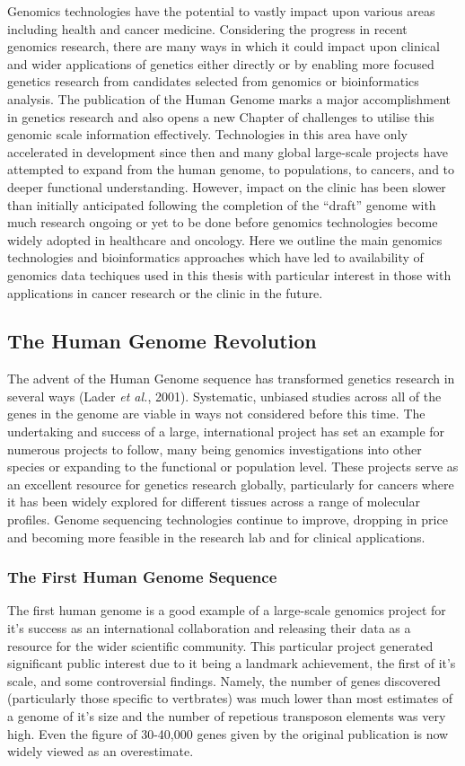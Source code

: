 Genomics technologies have the potential to vastly impact upon various areas including health and cancer medicine. Considering the progress in recent genomics research, there are many ways in which it could impact upon clinical and wider applications of genetics either directly or by enabling more focused genetics research from candidates selected from genomics or bioinformatics analysis. The publication of the Human Genome marks a major accomplishment in genetics research and also opens a new Chapter of challenges to utilise this genomic scale information effectively. Technologies in this area have only accelerated in development since then and many global large-scale projects have attempted to expand from the human genome, to populations, to cancers, and to deeper functional understanding. However, impact on the clinic has been slower than initially anticipated following the completion of the ``draft'' genome with much research ongoing or yet to be done before genomics technologies become widely adopted in healthcare and oncology. Here we outline the main genomics technologies and bioinformatics approaches which have led to availability of genomics data techiques used in this thesis with particular interest in those with applications in cancer research or the clinic in the future. 

\subsection{The Human Genome Revolution}
The advent of the Human Genome sequence has transformed genetics research in several ways (Lader \textit{et al.}, 2001). Systematic, unbiased studies across all of the genes in the genome are viable in ways not considered before this time. The undertaking and success of a large, international project has set an example for numerous projects to follow, many being genomics investigations into other species or expanding to the functional or population level. These projects serve as an excellent resource for genetics research globally, particularly for cancers where it has been widely explored for different tissues across a range of molecular profiles. Genome sequencing technologies continue to improve, dropping in price and becoming more feasible in the research lab and for clinical applications.

\subsubsection{The First Human Genome Sequence}
The first human genome is a good example of a large-scale genomics project for it's success as an international collaboration and releasing their data as a resource for the wider scientific community. This particular project generated significant public interest due to it being a landmark achievement, the first of it's scale, and some controversial findings. Namely, the number of genes discovered (particularly those specific to vertbrates) was much lower than most estimates of a genome of it's size and the number of repetious transposon elements was very high. Even the figure of 30-40,000 genes given by the original publication is now widely viewed as an overestimate. 

